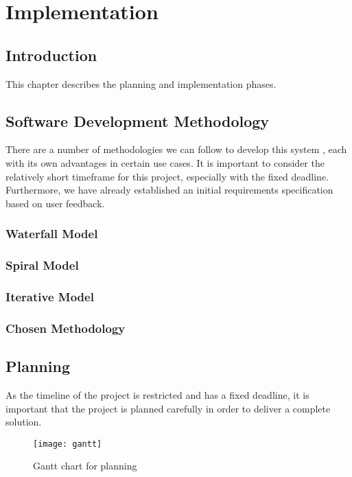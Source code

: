 \chapter{Implementation}
\label{ch:implementation}
\section{Introduction}
This chapter describes the planning and implementation phases.

\section{Software Development Methodology}
There are a number of methodologies we can follow to develop this system \cite{sdlc2010}, each with its own advantages in certain use cases. It is important to consider the relatively short timeframe for this project, especially with the fixed deadline. Furthermore, we have already established an initial requirements specification based on user feedback.
\subsection{Waterfall Model}
\subsection{Spiral Model}
\subsection{Iterative Model}

\subsection{Chosen Methodology}

\newpage
\section{Planning}
As the timeline of the project is restricted and has a fixed deadline, it is important that the project is planned carefully in order to deliver a complete solution.

\begin{landscape}
	\begin{figure}
		\centering
		\texttt{[image: gantt]}
		\caption{Gantt chart for planning}
		\label{fig:gantt}
	\end{figure}
\end{landscape}

